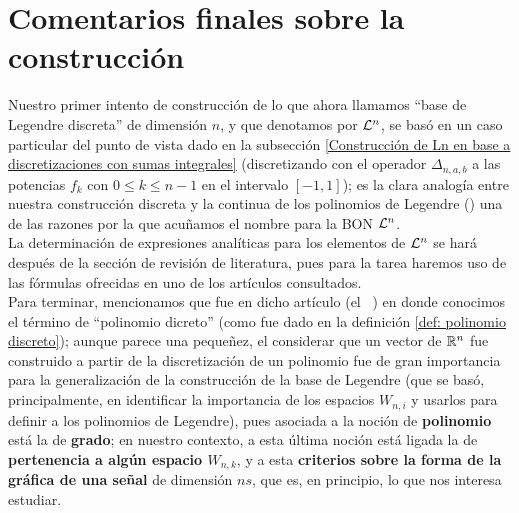 \section{Comentarios finales sobre la construcción} 
\label{sec: commentarios finales}
Nuestro primer intento de 
construcción de lo que ahora llamamos 
``base de Legendre discreta'' de dimensión $n$,
y que denotamos por
$\mathcal{L}^{n}$, se basó en 
un caso particular del punto de vista
dado en la subsección 
\ref{Construcción de Ln en base a discretizaciones con sumas integrales}
(discretizando con el operador $\Delta_{n,a,b}$
a las potencias $f_{k}$
con $0 \leq k \leq n-1$
en el intervalo $[-1,1]$); es la clara analogía 
entre nuestra construcción discreta y la continua
de los polinomios de Legendre () una de las
razones por la que acuñamos el nombre para
la BON $\mathcal{L}^{n}$. \\ 

La determinación de expresiones analíticas para los
elementos de $\mathcal{L}^{n}$ se hará después de la sección
de revisión de literatura, pues para la tarea haremos uso de las 
fórmulas ofrecidas en uno de los artículos consultados. \\

Para terminar, mencionamos que fue en dicho artículo
(el ~\cite{Neuman})
en donde conocimos el término de ``polinomio dicreto''
(como fue dado en la definición \ref{def: polinomio discreto});
aunque parece una pequeñez, el considerar que
un vector de $\mathbb{R}^{n}$ fue construido a partir
de la discretización de un polinomio fue de gran importancia
para la generalización de la construcción de la base de Legendre
(que se basó, principalmente,
en identificar la importancia de
los espacios $W_{n,i}$ y usarlos para definir
a los polinomios de Legendre),
pues asociada a la noción de \textbf{polinomio} está la de \textbf{grado}; 
en nuestro
contexto, a esta última noción está ligada la de \textbf{pertenencia a
algún espacio $W_{n,k}$}, y a esta \textbf{criterios sobre la forma de la
gráfica de una señal}
de dimensión $ns$, que es, en principio, lo que nos interesa estudiar.